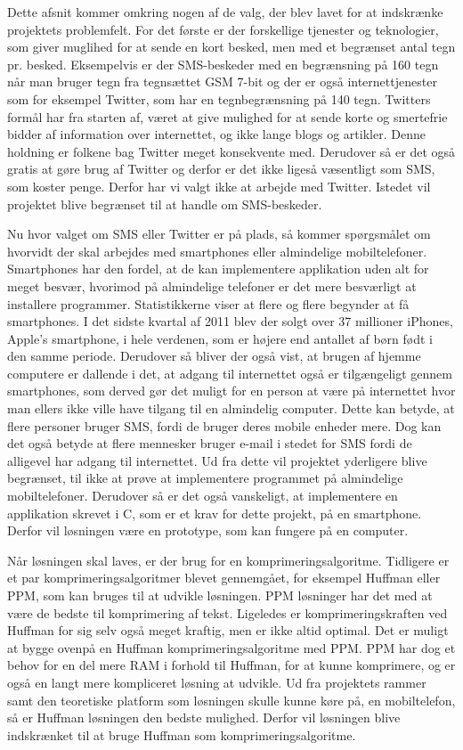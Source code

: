 Dette afsnit kommer omkring nogen af de valg, der blev lavet for at indskrænke projektets problemfelt. For det første er der forskellige tjenester og teknologier, som giver muglihed for at sende en kort besked, men med et begrænset antal tegn pr. besked. Eksempelvis er der SMS-beskeder med en begrænsning på 160 tegn når man bruger tegn fra tegnsættet GSM 7-bit\cite{Pro_1} og der er også internettjenester som for eksempel Twitter, som har en tegnbegrænsning på 140 tegn\cite{pro_af1}. Twitters formål har fra starten af, været at give mulighed for at sende korte og smertefrie bidder af information over internettet, og ikke lange blogs og artikler. Denne holdning er folkene bag Twitter meget konsekvente med\cite{pro_af2}. Derudover så er det også gratis at gøre brug af Twitter og derfor er det ikke ligeså væsentligt som SMS, som koster penge. Derfor har vi valgt ikke at arbejde med Twitter. Istedet vil projektet blive begrænset til at handle om SMS-beskeder.

Nu hvor valget om SMS eller Twitter er på plads, så kommer spørgsmålet om hvorvidt der skal arbejdes med smartphones eller almindelige mobiltelefoner. Smartphones har den fordel, at de kan implementere applikation uden alt for meget besvær, hvorimod på almindelige telefoner er det mere besværligt at installere programmer. Statistikkerne viser at flere og flere begynder at få smartphones\cite{pro_af3}. I det sidste kvartal af 2011 blev der solgt over 37 millioner iPhones, Apple's smartphone, i hele verdenen, som er højere end antallet af børn født i den samme periode\cite{pro_af4}. Derudover så bliver der også vist, at brugen af hjemme computere er dallende i det, at adgang til internettet også er tilgængeligt gennem smartphones, som derved gør det muligt for en person at være på internettet hvor man ellers ikke ville have tilgang til en almindelig computer\cite{pro_af3}. Dette kan betyde, at flere personer bruger SMS, fordi de bruger deres mobile enheder mere. Dog kan det også betyde at flere mennesker bruger e-mail i stedet for SMS fordi de alligevel har adgang til internettet. Ud fra dette vil projektet yderligere blive begrænset, til ikke at prøve at implementere programmet på almindelige mobiltelefoner. Derudover så er det også vanskeligt, at implementere en applikation skrevet i C, som er et krav for dette projekt, på en smartphone. Derfor vil løsningen være en prototype, som kan fungere på en computer. 

Når løsningen skal laves, er der brug for en komprimeringsalgoritme. Tidligere er et par komprimeringsalgoritmer blevet gennemgået, for eksempel Huffman eller PPM, som kan bruges til at udvikle løsningen. PPM løsninger har det med at være de bedste til komprimering af tekst. Ligeledes er komprimeringskraften ved Huffman for sig selv også meget kraftig, men er ikke altid optimal. Det er muligt at bygge ovenpå en Huffman komprimeringsalgoritme med PPM. PPM har dog et behov for en del mere RAM i forhold til Huffman, for at kunne komprimere, og er også en langt mere kompliceret løsning at udvikle. Ud fra projektets rammer samt den teoretiske platform som løsningen skulle kunne køre på, en mobiltelefon, så er Huffman løsningen den bedste mulighed. Derfor vil løsningen blive indskrænket til at bruge Huffman som komprimeringsalgoritme.\cite{pro_af5}

